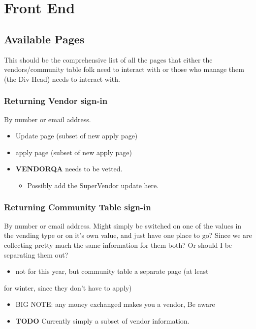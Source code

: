 \documentclass[captions=tablesignature]{scrartcl}
\begin{document}
\section{Front End}
\label{sec-3}
\subsection{Available Pages}
\label{sec-3-1}
This should be the comprehensive list of all the pages that either
the vendors/community table folk need to interact with or those who
manage them (the Div Head) needs to interact with.
\subsubsection{Returning Vendor sign-in}
\label{sec-3-1-1}
By number or email address.
\begin{itemize}
\item Update page (subset of new apply page)
\item apply page (subset of new apply page)
\end{itemize}
\begin{itemize}
\item {\bfseries\sffamily VENDORQA} needs to be vetted.
\label{sec-3-1-1-1}
\begin{itemize}
\item Possibly add the SuperVendor update here.
\end{itemize}
\end{itemize}

\subsubsection{Returning Community Table sign-in}
\label{sec-3-1-2}
By number or email address.  Might simply be switched on one of
the values in the vending type or on it's own value, and just have
one place to go?  Since we are collecting pretty much the same
information for them both?  Or should I be separating them out?
\begin{itemize}
\item not for this year, but community table a separate page (at least
\end{itemize}
for winter, since they don't have to apply)
\begin{itemize}
\item BIG NOTE: any money exchanged makes you a vendor, Be aware
\end{itemize}
\begin{itemize}
\item {\bfseries\sffamily TODO} Currently simply a subset of vendor information.
\label{sec-3-1-2-1}
\end{itemize}
\end{document}
